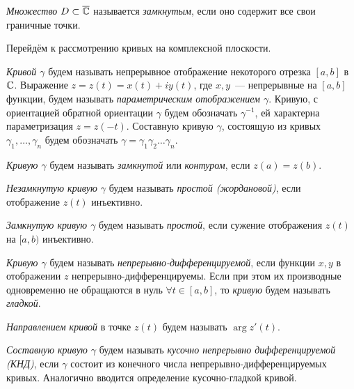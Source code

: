 \begin{definition}
\textit{Множество \(D \subset \overline{\mathbb{C}}\)} называется \textit{замкнутым}, если оно содержит все свои
граничные точки.
\end{definition}

Перейдём к рассмотрению кривых на комплексной плоскости.

\begin{definition}
\textit{Кривой \(\gamma\)} будем называть непрерывное отображение некоторого отрезка \([a, b]\) в
\(\mathbb{C}\). Выражение \(z = z(t) = x(t) + iy(t)\), где \(x, y\)~--- непрерывные на \([a,b]\) функции,
будем называть \textit{параметрическим отображением \(\gamma\)}. Кривую, с ориентацией обратной
ориентации \(\gamma\) будем обозначать \(\gamma^{-1}\), ей характерна параметризация \(z = z(-t)\).
Составную кривую \(\gamma\), состоящую из кривых \(\gamma_1, \dots, \gamma_n\) будем обозначать
\(\gamma = \gamma_1 \gamma_2 \dots \gamma_n\).
\end{definition}

\begin{definition}
\textit{Кривую \(\gamma\)} будем называть \textit{замкнутой} или \textit{контуром}, если \(z(a) =
z(b)\).
\end{definition}

\begin{definition}
\textit{Незамкнутую кривую \(\gamma\)} будем называть \textit{простой (жордановой)}, если отображение
\(z(t)\) инъективно.
\end{definition}

\begin{definition}
\textit{Замкнутую кривую \(\gamma\)} будем называть \textit{простой}, если сужение отображения
\(z(t)\) на \([a, b)\) инъективно.
\end{definition}

\begin{definition}
\textit{Кривую \(\gamma\)} будем называть \textit{непрерывно-дифференцируемой}, если функции \(x, y\)
в отображении \(z\) непрерывно-дифференцируемы. Если при этом их производные одновременно не 
обращаются в нуль \(\forall t \in [a,b]\), то \textit{кривую} будем называть \textit{гладкой}.
\end{definition}

\begin{definition}
\textit{Направлением кривой} в точке \(z(t)\) будем называть \(\arg{z'(t)}\).
\end{definition}

\begin{definition}
\textit{Составную кривую \(\gamma\)} будем называть \textit{кусочно непрерывно дифференцируемой
(КНД)}, если \(\gamma\) состоит из конечного числа непрерывно-дифференцируемых кривых. Аналогично
вводится определение кусочно-гладкой кривой.
\end{definition}

